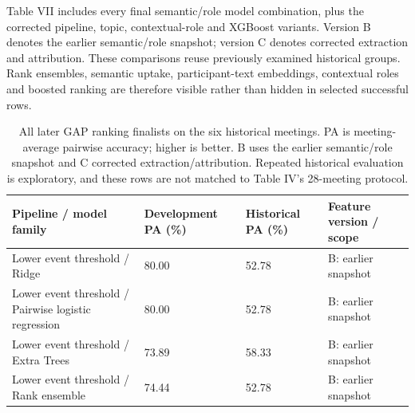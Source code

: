 \documentclass[journal]{IEEEtran}
\begin{document}
Table VII includes every final semantic/role model combination, plus the corrected pipeline, topic, contextual-role and XGBoost variants. Version B denotes the earlier semantic/role snapshot; version C denotes corrected extraction and attribution. These comparisons reuse previously examined historical groups. Rank ensembles, semantic uptake, participant-text embeddings, contextual roles and boosted ranking are therefore visible rather than hidden in selected successful rows.

\begin{table}[t]
\caption{All later GAP ranking finalists on the six historical meetings. PA is meeting-average pairwise accuracy; higher is better. B uses the earlier semantic/role snapshot and C corrected extraction/attribution. Repeated historical evaluation is exploratory, and these rows are not matched to Table IV's 28-meeting protocol.}
\label{tab:7}
\centering\footnotesize
\setlength{\tabcolsep}{3pt}
\renewcommand{\arraystretch}{1.13}
\begin{tabular}{p{}p{}p{}p{}}
\toprule
{\raggedright Pipeline / model family\par} & {\raggedright Development PA (\%)\par} & {\raggedright Historical PA (\%)\par} & {\raggedright Feature version / scope\par} \\
\midrule
{\raggedright Lower event threshold / Ridge\par} & {\raggedright 80.00\par} & {\raggedright 52.78\par} & {\raggedright B: earlier snapshot\par} \\
{\raggedright Lower event threshold / Pairwise logistic regression\par} & {\raggedright 80.00\par} & {\raggedright 52.78\par} & {\raggedright B: earlier snapshot\par} \\
{\raggedright Lower event threshold / Extra Trees\par} & {\raggedright 73.89\par} & {\raggedright 58.33\par} & {\raggedright B: earlier snapshot\par} \\
{\raggedright Lower event threshold / Rank ensemble\par} & {\raggedright 74.44\par} & {\raggedright 52.78\par} & {\raggedright B: earlier snapshot\par} \\

\end{tabular}
\end{table}
\end{document}
